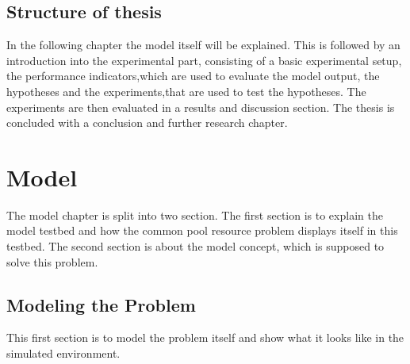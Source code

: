 \documentclass[a4paper]{article}
\begin{document}
\newpage
\subsection{Structure of thesis}
In the following chapter the model itself will be explained. This is followed by an introduction into the experimental part, 
consisting of a basic experimental setup, the performance indicators,which are used to evaluate the model output, the 
hypotheses and the experiments,that are used to test the hypotheses. The experiments are then evaluated in a 
results and discussion section. The thesis is concluded with a conclusion and further research chapter.




\clearpage

\section{Model}
The model chapter is split into two section. The first section is to explain the model testbed and how the common pool
resource problem displays itself in this testbed. The second section is about the model concept, which is supposed to 
solve this problem. 
\subsection{Modeling the Problem}
This first section is to model the problem itself and show what it looks like in the simulated environment.
\end{document}
